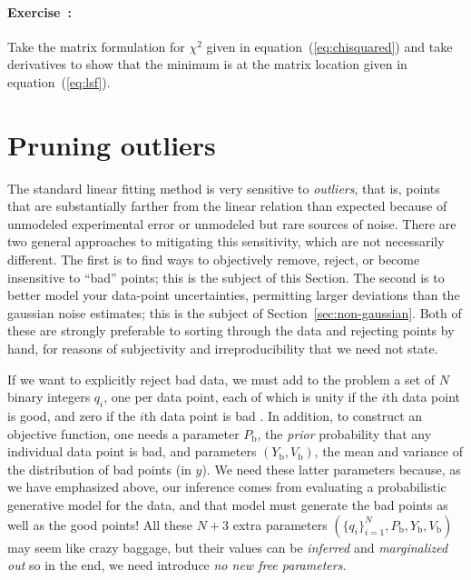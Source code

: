 \documentclass[12pt,twoside]{article}
\newcommand{\sectionname}{Section}
\newcommand{\equationname}{equation}
\newcommand{\problemname}{Exercise}
\newcounter{problem}
\newenvironment{problem}{\paragraph{\problemname~\theproblem:}\refstepcounter{problem}}{}
\newcommand{\setofall}[3]{\{{#1}\}_{{#2}}^{{#3}}}
\newcommand{\allq}{\setofall{q_i}{i=1}{N}}
\newcommand{\Pbad}{P_{\mathrm{b}}}
\newcommand{\Ybad}{Y_{\mathrm{b}}}
\newcommand{\Vbad}{V_{\mathrm{b}}}
\begin{document}
\begin{problem}
Take the matrix formulation for $\chi^2$ given in
\equationname~(\ref{eq:chisquared}) and take derivatives to show that
the minimum is at the matrix location given in
\equationname~(\ref{eq:lsf}).
\end{problem}

\section{Pruning outliers}\label{sec:outliers}

The standard linear fitting method is very sensitive to
\emph{outliers}, that is, points that are substantially farther from
the linear relation than expected because of unmodeled experimental
error or unmodeled but rare sources of noise.  There are two general
approaches to mitigating this sensitivity, which are not necessarily
different.  The first is to find ways to objectively remove, reject,
or become insensitive to ``bad'' points; this is the subject of this
\sectionname.  The second is to better model your data-point
uncertainties, permitting larger deviations than the gaussian noise
estimates; this is the subject of \sectionname~\ref{sec:non-gaussian}.
Both of these are strongly preferable to sorting through the data and
rejecting points by hand, for reasons of subjectivity and
irreproducibility that we need not state.

If we want to explicitly reject bad data, we must add to the problem a
set of $N$ binary integers $q_i$, one per data point, each of which is
unity if the $i$th data point is good, and zero if the $i$th data
point is bad \citep{pressH0,jaynes}.  In addition, to construct an
objective function, one needs a parameter $\Pbad$, the \emph{prior}
probability that any individual data point is bad, and parameters
$(\Ybad,\Vbad)$, the mean and variance of the distribution of bad
points (in $y$).  We need these latter parameters because, as we have
emphasized above, our inference comes from evaluating a probabilistic
generative model for the data, and that model must generate the bad
points as well as the good points!  All these $N+3$ extra parameters
$(\allq,\Pbad,\Ybad,\Vbad)$ may seem like crazy baggage, but their
values can be \emph{inferred} and \emph{marginalized out} so in the
end, we need introduce \emph{no new free parameters}.
\end{document}
